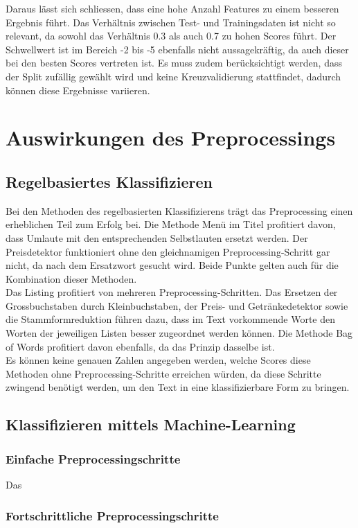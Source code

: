 Daraus lässt sich schliessen, dass eine hohe Anzahl Features zu einem besseren Ergebnis führt.
Das Verhältnis zwischen Test- und Trainingsdaten ist nicht so relevant, da sowohl das Verhältnis 0.3 als auch 0.7 zu hohen Scores führt.
Der Schwellwert ist im Bereich -2 bis -5 ebenfalls nicht aussagekräftig, da auch dieser bei den besten Scores vertreten ist.
Es muss zudem berücksichtigt werden, dass der Split zufällig gewählt wird und keine Kreuzvalidierung stattfindet, dadurch können diese Ergebnisse variieren.
\FloatBarrier
\section{Auswirkungen des Preprocessings}
\subsection{Regelbasiertes Klassifizieren}
Bei den Methoden des regelbasierten Klassifizierens trägt das Preprocessing einen erheblichen Teil zum Erfolg bei.
Die Methode \glqq Menü im Titel\grqq{} profitiert davon, dass Umlaute mit den entsprechenden Selbstlauten ersetzt werden.
Der Preisdetektor funktioniert ohne den gleichnamigen Preprocessing-Schritt gar nicht, da nach dem Ersatzwort gesucht wird.
Beide Punkte gelten auch für die Kombination dieser Methoden.\\
Das Listing profitiert von mehreren Preprocessing-Schritten.
Das Ersetzen der Grossbuchstaben durch Kleinbuchstaben, der Preis- und Getränkedetektor sowie die Stammformreduktion führen dazu, dass im Text vorkommende Worte den Worten der jeweiligen Listen besser zugeordnet werden können.
Die Methode \glqq Bag of Words\grqq{} profitiert davon ebenfalls, da das Prinzip dasselbe ist.\\
Es können keine genauen Zahlen angegeben werden, welche Scores diese Methoden ohne Preprocessing-Schritte erreichen würden, da diese Schritte zwingend benötigt werden, um den Text in eine klassifizierbare Form zu bringen.
\subsection{Klassifizieren mittels Machine-Learning}
\subsubsection{Einfache Preprocessingschritte}
Das
\subsubsection{Fortschrittliche Preprocessingschritte}
